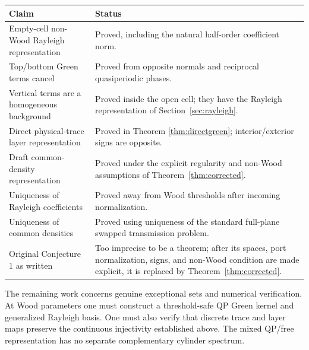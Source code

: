 \documentclass[11pt]{article}
\theoremstyle{plain}
\theoremstyle{definition}
\theoremstyle{remark}
\begin{document}
\begin{center}
\begin{tabularx}{\textwidth}{>{\raggedright\arraybackslash}p{}X}
\toprule
Claim & Status \\
\midrule
Empty-cell non-Wood Rayleigh representation & Proved, including the natural
half-order coefficient norm.\\
Top/bottom Green terms cancel & Proved from opposite normals and reciprocal
quasiperiodic phases.\\
Vertical terms are a homogeneous background & Proved inside the open cell;
they have the Rayleigh representation of Section~\ref{sec:rayleigh}.\\
Direct physical-trace layer representation & Proved in Theorem
\ref{thm:directgreen}; interior/exterior signs are opposite.\\
Draft common-density representation & Proved under the explicit regularity and
non-Wood assumptions of Theorem~\ref{thm:corrected}.\\
Uniqueness of Rayleigh coefficients & Proved away from Wood thresholds after
incoming normalization.\\
Uniqueness of common densities & Proved using uniqueness of the standard
full-plane swapped transmission problem.\\
Original Conjecture 1 as written & Too imprecise to be a theorem; after its
spaces, port normalization, signs, and non-Wood condition are made explicit,
it is replaced by Theorem~\ref{thm:corrected}.\\
\bottomrule
\end{tabularx}
\end{center}

The remaining work concerns genuine exceptional sets and numerical
verification.  At Wood parameters one must construct a threshold-safe QP Green
kernel and generalized Rayleigh basis.  One must also verify that discrete
trace and layer maps preserve the continuous injectivity established above.
The mixed QP/free representation has no separate complementary cylinder
spectrum.
\end{document}
